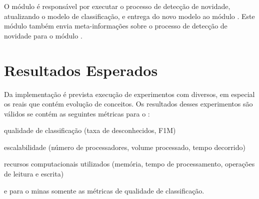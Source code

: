 O módulo \detector é responsável por executar o processo de detecção de
novidade, atualizando o modelo de classificação, e entrega do novo modelo
ao módulo \classify.
Este módulo também envia meta-informações sobre o processo de detecção de
novidade para o módulo \sink.

\section{Resultados Esperados}\label{sec:esperados}

Da implementação \mfog é prevista execução de experimentos com \datasets
diversos, em especial os \datasets reais que contém evolução de conceitos.
Os resultados desses experimentos são válidos se contém as seguintes métricas
para o \mfog: \begin{enumerate*}[label={\alph*)}]
  \item qualidade de classificação (taxa de desconhecidos, F1M)
  \item escalabilidade (número de processadores, volume processado, tempo decorrido)
  \item recursos computacionais utilizados (memória, tempo de processamento, operações de leitura e escrita)
\end{enumerate*}
e para o minas somente as métricas de qualidade de classificação.




